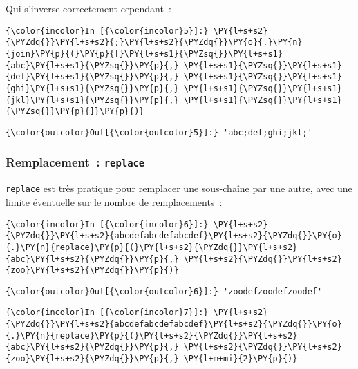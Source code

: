     Qui s'inverse correctement cependant~:

    \begin{Verbatim}[commandchars=\\\{\}]
{\color{incolor}In [{\color{incolor}5}]:} \PY{l+s+s2}{\PYZdq{}}\PY{l+s+s2}{;}\PY{l+s+s2}{\PYZdq{}}\PY{o}{.}\PY{n}{join}\PY{p}{(}\PY{p}{[}\PY{l+s+s1}{\PYZsq{}}\PY{l+s+s1}{abc}\PY{l+s+s1}{\PYZsq{}}\PY{p}{,} \PY{l+s+s1}{\PYZsq{}}\PY{l+s+s1}{def}\PY{l+s+s1}{\PYZsq{}}\PY{p}{,} \PY{l+s+s1}{\PYZsq{}}\PY{l+s+s1}{ghi}\PY{l+s+s1}{\PYZsq{}}\PY{p}{,} \PY{l+s+s1}{\PYZsq{}}\PY{l+s+s1}{jkl}\PY{l+s+s1}{\PYZsq{}}\PY{p}{,} \PY{l+s+s1}{\PYZsq{}}\PY{l+s+s1}{\PYZsq{}}\PY{p}{]}\PY{p}{)}
\end{Verbatim}


\begin{Verbatim}[commandchars=\\\{\}]
{\color{outcolor}Out[{\color{outcolor}5}]:} 'abc;def;ghi;jkl;'
\end{Verbatim}
            
    \hypertarget{remplacement-replace}{%
\subsubsection{\texorpdfstring{Remplacement~:
\texttt{replace}}{Remplacement~: replace}}\label{remplacement-replace}}

    \texttt{replace} est très pratique pour remplacer une sous-chaîne par
une autre, avec une limite éventuelle sur le nombre de remplacements~:

    \begin{Verbatim}[commandchars=\\\{\}]
{\color{incolor}In [{\color{incolor}6}]:} \PY{l+s+s2}{\PYZdq{}}\PY{l+s+s2}{abcdefabcdefabcdef}\PY{l+s+s2}{\PYZdq{}}\PY{o}{.}\PY{n}{replace}\PY{p}{(}\PY{l+s+s2}{\PYZdq{}}\PY{l+s+s2}{abc}\PY{l+s+s2}{\PYZdq{}}\PY{p}{,} \PY{l+s+s2}{\PYZdq{}}\PY{l+s+s2}{zoo}\PY{l+s+s2}{\PYZdq{}}\PY{p}{)}
\end{Verbatim}


\begin{Verbatim}[commandchars=\\\{\}]
{\color{outcolor}Out[{\color{outcolor}6}]:} 'zoodefzoodefzoodef'
\end{Verbatim}
            
    \begin{Verbatim}[commandchars=\\\{\}]
{\color{incolor}In [{\color{incolor}7}]:} \PY{l+s+s2}{\PYZdq{}}\PY{l+s+s2}{abcdefabcdefabcdef}\PY{l+s+s2}{\PYZdq{}}\PY{o}{.}\PY{n}{replace}\PY{p}{(}\PY{l+s+s2}{\PYZdq{}}\PY{l+s+s2}{abc}\PY{l+s+s2}{\PYZdq{}}\PY{p}{,} \PY{l+s+s2}{\PYZdq{}}\PY{l+s+s2}{zoo}\PY{l+s+s2}{\PYZdq{}}\PY{p}{,} \PY{l+m+mi}{2}\PY{p}{)}
\end{Verbatim}


